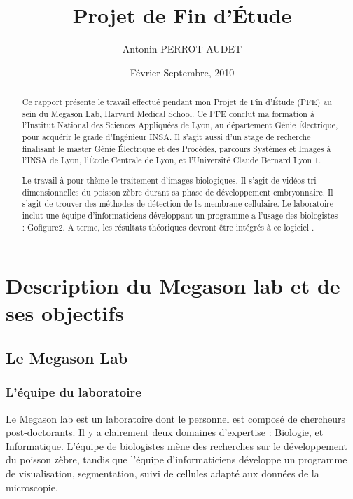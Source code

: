 




\title{Projet de Fin d'Étude}   %
\author{Antonin PERROT-AUDET}         %
\date{Février-Septembre, 2010}    %
\maketitle

\begin{abstract}
  Ce rapport présente le travail effectué pendant mon Projet de Fin d'Étude (PFE) au sein du Megason Lab, Harvard Medical School. Ce PFE conclut ma formation à l'Institut National des Sciences Appliquées de Lyon, au département Génie Électrique, pour acquérir le grade d'Ingénieur INSA. Il s'agit aussi d'un stage de recherche finalisant le master Génie Électrique et des Procédés, parcours Systèmes et Images à l'INSA de Lyon, l'École Centrale de Lyon, et l'Université Claude Bernard Lyon 1.
  
  Le travail à pour thème le traitement d'images biologiques. Il s'agit de vidéos tri-dimensionnelles du poisson zèbre durant sa phase de développement embryonnaire. Il s'agit de trouver des méthodes de détection de la membrane cellulaire. Le laboratoire inclut une équipe d'informaticiens développant un programme a l'usage des biologistes : Gofigure2\cite{refGofigure2}. A terme, les résultats théoriques devront être intégrés à ce logiciel .
  
  
\tableofcontents  
  
 
\end{abstract}



\chapter{Description du Megason lab et de ses objectifs} 

\section{Le Megason Lab}

\subsection{L'équipe du laboratoire}
Le Megason lab est un laboratoire dont le personnel est composé de chercheurs post-doctorants.
Il y a clairement deux domaines d'expertise : Biologie, et Informatique.
L'équipe de biologistes mène des recherches sur le développement du poisson zèbre,
tandis que l'équipe d'informaticiens développe un programme de visualisation,
segmentation, suivi de cellules adapté aux données de la microscopie.

